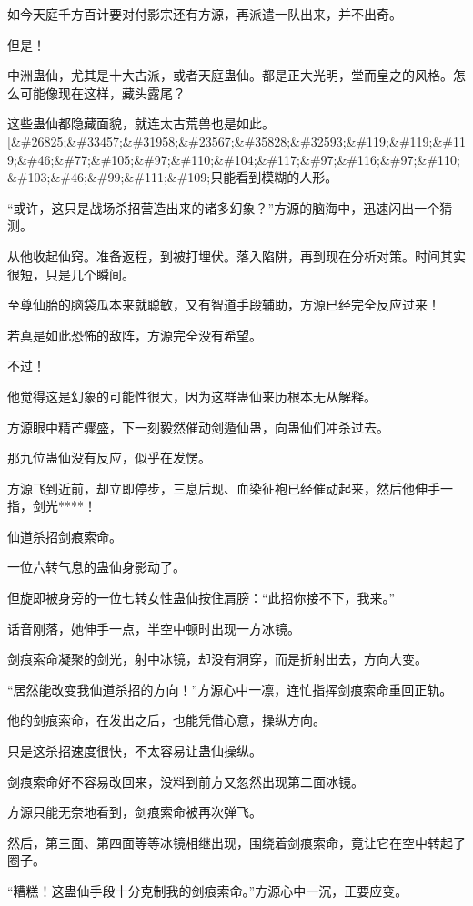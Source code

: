 \begin{this_body}
如今天庭千方百计要对付影宗还有方源，再派遣一队出来，并不出奇。

但是！

中洲蛊仙，尤其是十大古派，或者天庭蛊仙。都是正大光明，堂而皇之的风格。怎么可能像现在这样，藏头露尾？

这些蛊仙都隐藏面貌，就连太古荒兽也是如此。[\&\#26825;\&\#33457;\&\#31958;\&\#23567;\&\#35828;\&\#32593;\&\#119;\&\#119;\&\#119;\&\#46;\&\#77;\&\#105;\&\#97;\&\#110;\&\#104;\&\#117;\&\#97;\&\#116;\&\#97;\&\#110;\&\#103;\&\#46;\&\#99;\&\#111;\&\#109;只能看到模糊的人形。

“或许，这只是战场杀招营造出来的诸多幻象？”方源的脑海中，迅速闪出一个猜测。

从他收起仙窍。准备返程，到被打埋伏。落入陷阱，再到现在分析对策。时间其实很短，只是几个瞬间。

至尊仙胎的脑袋瓜本来就聪敏，又有智道手段辅助，方源已经完全反应过来！

若真是如此恐怖的敌阵，方源完全没有希望。

不过！

他觉得这是幻象的可能性很大，因为这群蛊仙来历根本无从解释。

方源眼中精芒骤盛，下一刻毅然催动剑遁仙蛊，向蛊仙们冲杀过去。

那九位蛊仙没有反应，似乎在发愣。

方源飞到近前，却立即停步，三息后现、血染征袍已经催动起来，然后他伸手一指，剑光****！

仙道杀招剑痕索命。

一位六转气息的蛊仙身影动了。

但旋即被身旁的一位七转女性蛊仙按住肩膀：“此招你接不下，我来。”

话音刚落，她伸手一点，半空中顿时出现一方冰镜。

剑痕索命凝聚的剑光，射中冰镜，却没有洞穿，而是折射出去，方向大变。

“居然能改变我仙道杀招的方向！”方源心中一凛，连忙指挥剑痕索命重回正轨。

他的剑痕索命，在发出之后，也能凭借心意，操纵方向。

只是这杀招速度很快，不太容易让蛊仙操纵。

剑痕索命好不容易改回来，没料到前方又忽然出现第二面冰镜。

方源只能无奈地看到，剑痕索命被再次弹飞。

然后，第三面、第四面等等冰镜相继出现，围绕着剑痕索命，竟让它在空中转起了圈子。

“糟糕！这蛊仙手段十分克制我的剑痕索命。”方源心中一沉，正要应变。


\end{this_body}
